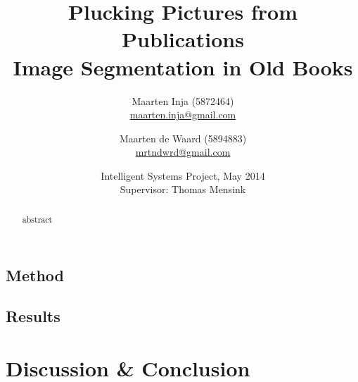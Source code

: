 \documentclass{article} %
\title{Plucking Pictures from Publications\\ \large
Image Segmentation in Old Books}
\author{Maarten Inja (5872464)\\\small\url{maarten.inja@gmail.com} \and Maarten de
Waard (5894883)\\\small\url{mrtndwrd@gmail.com}}
\date{Intelligent Systems Project, May 2014\\
Supervisor: Thomas Mensink}
\begin{document}
\maketitle

\begin{abstract}
abstract
\end{abstract}















\subsection{Method}
\label{subsec:imagelocmethod}

\subsection{Results}
\label{subsec:imagelocresults}


\section{Discussion \& Conclusion}
\label{sec:discussionconclusion}




\end{document}
